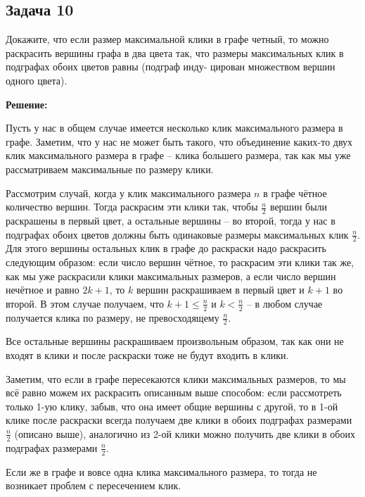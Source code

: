\documentclass[a4paper,14pt]{article} %
\begin{document}
\begin{center}
\subsection{Задача 10}
\end{center}

 Докажите, что если размер максимальной клики в графе четный,
то можно раскрасить вершины графа в два цвета так, что размеры
максимальных клик в подграфах обоих цветов равны (подграф инду-
цирован множеством вершин одного цвета).
\begin{center}
\bfseries
{\Large Решение: }
\end{center}


Пусть у нас в общем случае имеется несколько клик максимального размера в графе. Заметим, что у нас не может быть такого, что объединение каких-то двух клик максимального размера в графе -- клика большего размера, так как мы уже рассматриваем максимальные по размеру клики.

Рассмотрим случай, когда у клик максимального размера $n$ в графе чётное количество вершин. Тогда раскрасим эти клики так, чтобы $\frac{n}{2}$ вершин были раскрашены в первый цвет, а остальные вершины -- во второй, тогда у нас в подграфах обоих цветов должны быть одинаковые размеры максимальных клик $\frac{n}{2}$. Для этого вершины остальных клик в графе до раскраски надо раскрасить следующим образом: если число вершин чётное, то раскрасим эти клики так же, как мы уже раскрасили клики максимальных размеров, а если число вершин нечётное и равно $2k + 1$, то $k$ вершин раскрашиваем в первый цвет и $k+1$ во второй. В этом случае получаем, что $k+1 \leqslant \frac{n}{2}$ и $k < \frac{n}{2}$ -- в любом случае получается клика по размеру, не превосходящему $\frac{n}{2}$. 

Все остальные вершины раскрашиваем произвольным образом, так как они не входят в клики и после раскраски тоже не будут входить в клики.

Заметим, что если в графе пересекаются клики максимальных размеров, то мы всё равно можем их раскрасить описанным выше способом: если рассмотреть только 1-ую клику, забыв, что она имеет общие вершины с другой, то в 1-ой клике после раскраски всегда получаем две клики в обоих подграфах размерами $\frac{n}{2}$ (описано выше), аналогично из 2-ой клики можно получить две клики в обоих подграфах размерами $\frac{n}{2}$.

Если же в графе и вовсе одна клика максимального размера, то тогда не возникает проблем с пересечением клик.
\end{document}
